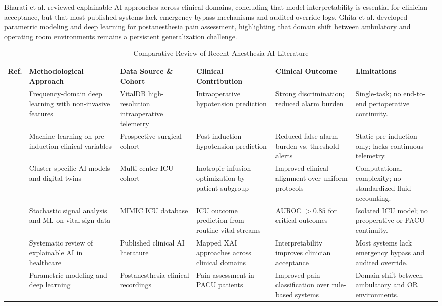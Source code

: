 \documentclass[conference]{IEEEtran}
\begin{document}
Bharati et al. \cite{ref11} reviewed explainable AI approaches across clinical domains, concluding that model interpretability is essential for clinician acceptance, but that most published systems lack emergency bypass mechanisms and audited override logs. Ghita et al. \cite{ref15} developed parametric modeling and deep learning for postanesthesia pain assessment, highlighting that domain shift between ambulatory and operating room environments remains a persistent generalization challenge.

\begin{table}[t]
\centering
\caption{Comparative Review of Recent Anesthesia AI Literature}
\label{tab:lit_comparison}
\begin{tabularx}{\textwidth}{c p{3.2cm} p{2.8cm} p{3.2cm} p{2.8cm} p{3.5cm}}
\toprule
\textbf{Ref.} & \textbf{Methodological Approach} & \textbf{Data Source \& Cohort} & \textbf{Clinical Contribution} & \textbf{Clinical Outcome} & \textbf{Limitations} \\
\midrule
\cite{ref1} & Frequency-domain deep learning with non-invasive features & VitalDB high-resolution intraoperative telemetry & Intraoperative hypotension prediction & Strong discrimination; reduced alarm burden & Single-task; no end-to-end perioperative continuity. \\
\cite{ref5} & Machine learning on pre-induction clinical variables & Prospective surgical cohort & Post-induction hypotension prediction & Reduced false alarm burden vs. threshold alerts & Static pre-induction only; lacks continuous telemetry. \\
\cite{ref4} & Cluster-specific AI models and digital twins & Multi-center ICU cohort & Inotropic infusion optimization by patient subgroup & Improved clinical alignment over uniform protocols & Computational complexity; no standardized fluid accounting. \\
\cite{ref12} & Stochastic signal analysis and ML on vital sign data & MIMIC ICU database & ICU outcome prediction from routine vital streams & AUROC $>0.85$ for critical outcomes & Isolated ICU model; no preoperative or PACU continuity. \\
\cite{ref11} & Systematic review of explainable AI in healthcare & Published clinical AI literature & Mapped XAI approaches across clinical domains & Interpretability improves clinician acceptance & Most systems lack emergency bypass and audited override. \\
\cite{ref15} & Parametric modeling and deep learning & Postanesthesia clinical recordings & Pain assessment in PACU patients & Improved pain classification over rule-based systems & Domain shift between ambulatory and OR environments. \\
\bottomrule
\end{tabularx}
\end{table}
\end{document}
